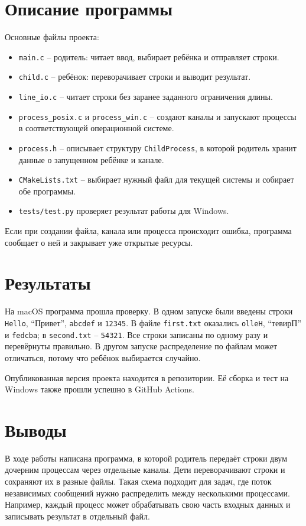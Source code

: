 \documentclass[pdf,unicode,12pt,a4paper,oneside,fleqn]{article}
\begin{document}
\section{Описание программы}
Основные файлы проекта:
\begin{itemize}[noitemsep,topsep=0pt]
\item \texttt{main.c} -- родитель: читает ввод, выбирает ребёнка и отправляет строки.
\item \texttt{child.c} -- ребёнок: переворачивает строки и выводит результат.
\item \texttt{line\_io.c} -- читает строки без заранее заданного ограничения длины.
\item \texttt{process\_posix.c} и \texttt{process\_win.c} -- создают каналы и запускают
процессы в соответствующей операционной системе.
\item \texttt{process.h} -- описывает структуру \texttt{ChildProcess}, в которой
родитель хранит данные о запущенном ребёнке и канале.
\item \texttt{CMakeLists.txt} -- выбирает нужный файл для текущей системы и собирает
обе программы.
\item \texttt{tests/test.py} проверяет результат работы для Windows.
\end{itemize}

Если при создании файла, канала или процесса происходит ошибка, программа сообщает
о ней и закрывает уже открытые ресурсы.


\section{Результаты}
На macOS программа прошла проверку. В одном запуске были введены строки
\texttt{Hello}, \enquote{Привет}, \texttt{abcdef} и \texttt{12345}.
В файле \texttt{first.txt} оказались \texttt{olleH}, \enquote{тевирП} и
\texttt{fedcba}; в \texttt{second.txt} -- \texttt{54321}.
Все строки записаны по одному разу и перевёрнуты правильно. В другом запуске
распределение по файлам может отличаться, потому что ребёнок выбирается случайно.

Опубликованная версия проекта находится в репозитории\cite{source}.
Её сборка и тест на Windows также прошли успешно в GitHub Actions\cite{ci}.



\section{Выводы}
В ходе работы написана программа, в которой родитель передаёт строки двум дочерним
процессам через отдельные каналы. Дети переворачивают строки и сохраняют их
в разные файлы. Такая схема подходит для задач, где поток независимых сообщений нужно распределить
между несколькими процессами. Например, каждый процесс может обрабатывать свою
часть входных данных и записывать результат в отдельный файл.
\end{document}
